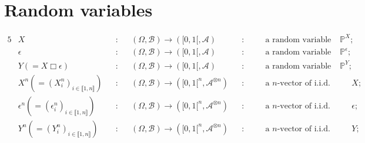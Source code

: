 \section*{Random variables}
\begin{alignat*}{5}
& X &&:&& (\Omega, \mathcal{B}) \rightarrow ([0,1[, \mathcal{A}) &&: && \quad \text{a random variable with distribution } \mathds{P}^{X};\\
& \epsilon &&:&& (\Omega, \mathcal{B}) \rightarrow ([0,1[, \mathcal{A})  &&: && \quad \text{a random variable with distribution } \mathds{P}^{\epsilon};\\
& Y (=X \Box \epsilon) &&:&& (\Omega, \mathcal{B}) \rightarrow ([0,1[, \mathcal{A})  &&: && \quad \text{a random variable with distribution } \mathds{P}^{Y};\\
& X^{n} (=(X^{n}_{i})_{i \in \llbracket 1, n \rrbracket}) &&:&& (\Omega, \mathcal{B}) \rightarrow ([0,1[^{n}, \mathcal{A}^{\otimes n}) &&: && \quad \text{a } n \text{-vector of i.i.d. replications of } X;\\
& \epsilon^{n} (=(\epsilon^{n}_{i})_{i \in \llbracket 1, n \rrbracket})&&:&& (\Omega, \mathcal{B}) \rightarrow ([0,1[^{n}, \mathcal{A}^{\otimes n}) &&: && \quad \text{a } n \text{-vector of i.i.d. replications of } \epsilon;\\
& Y^{n} (=(Y^{n}_{i})_{i \in \llbracket 1, n \rrbracket}) &&:&& (\Omega, \mathcal{B}) \rightarrow ([0,1[^{n}, \mathcal{A}^{\otimes n})  &&: && \quad \text{a } n \text{-vector of i.i.d. replications of } Y;
\end{alignat*}

